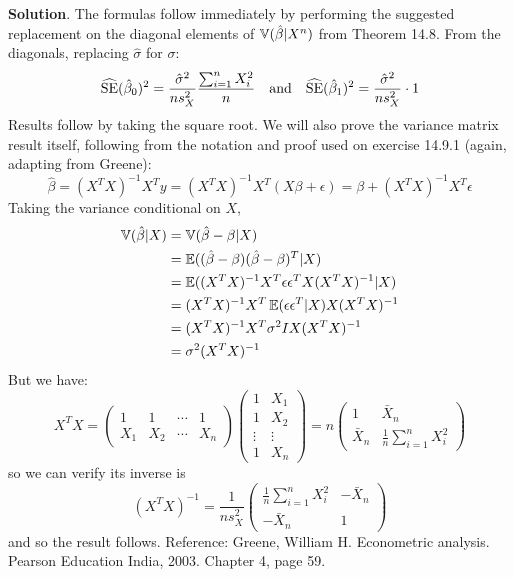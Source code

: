 \textbf{Solution}.
The formulas follow immediately by performing the suggested replacement
on the diagonal elements of \(\operatorname{\mathbb{V}}(\hat{\beta} | X^{n})\) from
Theorem 14.8. From the diagonals, replacing \(\hat{\sigma}\) for
\(\sigma\):
\[
\widehat{\operatorname{\mathrm{SE}}}(\hat{\beta}_{0})^{2} = \frac{\hat{\sigma}^{2}}{n s_X^{2}} \frac{\sum_{i=1}^{n} X_{i}^{2}}{n}
\quad \text{and} \quad
\widehat{\operatorname{\mathrm{SE}}}(\hat{\beta}_{1})^{2} = \frac{\hat{\sigma}^{2}}{n s_X^{2}} \cdot 1
\]
Results follow by taking the square root.
We will also prove the variance matrix result itself, following from the
notation and proof used on exercise 14.9.1 (again, adapting from
Greene):
\[
\hat{\beta} = (X^T X)^{-1}X^T y = (X^T X)^{-1}X^T (X \beta + \epsilon) = \beta + (X^T X)^{-1}X^T \epsilon
\]
Taking the variance conditional on \(X\),
\begin{align*}
\operatorname{\mathbb{V}}(\hat{\beta} | X) &= \operatorname{\mathbb{V}}(\hat{\beta} - \beta | X) \\
&= \operatorname{\mathbb{E}}((\hat{\beta} - \beta)(\hat{\beta} - \beta)^T | X)  \\
&= \operatorname{\mathbb{E}}((X^T X)^{-1}X^T \epsilon\epsilon^T X(X^T X)^{-1} | X) \\
&= (X^T X)^{-1}X^T \operatorname{\mathbb{E}}(\epsilon\epsilon^T | X) X(X^T X)^{-1} \\
&= (X^T X)^{-1}X^T \sigma^{2} I X(X^T X)^{-1} \\
&= \sigma^{2} (X^T X)^{-1} 
\end{align*}
But we have:
\[
X^T X = \begin{pmatrix}
1 & 1 & \cdots & 1 \\
X_{1} & X_{2} & \cdots & X_{n}
\end{pmatrix} \begin{pmatrix}
1 & X_{1} \\
1 & X_{2} \\
\vdots & \vdots \\
1 & X_{n}
\end{pmatrix} = 
n \begin{pmatrix}
1 & \bar{X}_{n} \\
\bar{X}_{n} & \frac{1}{n}\sum_{i=1}^{n} X_{i}^{2}
\end{pmatrix}
\]
so we can verify its inverse is
\[
(X^T X)^{-1} = \frac{1}{n s_X^{2}} \begin{pmatrix}
\frac{1}{n} \sum_{i=1}^{n} X_{i}^{2} & - \bar{X}_{n} \\
-\bar{X}_{n} & 1
\end{pmatrix}
\]
and so the result follows.
Reference: Greene, William H. Econometric analysis. Pearson Education
India, 2003. Chapter 4, page 59.

